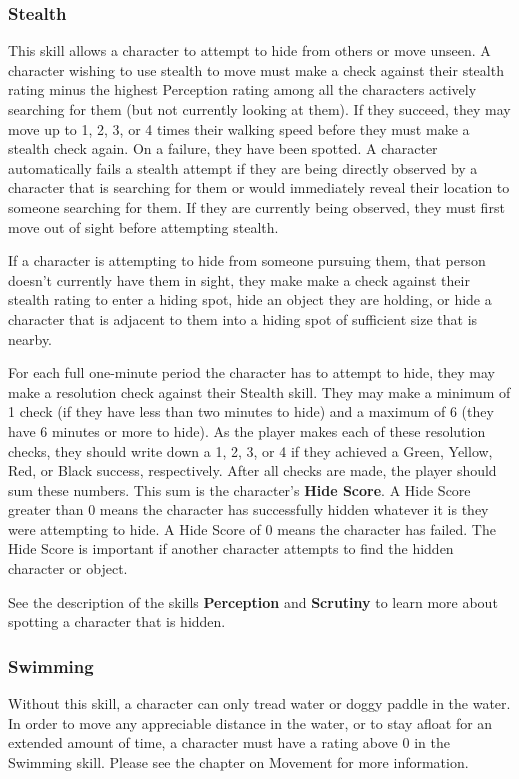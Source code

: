 \documentclass[oneside]{book}
\begin{document}
\begin{multicols}{2}
\subsubsection{Stealth}
This skill allows a character to attempt to hide from others or move unseen. A character wishing to use stealth to move must make a check against their stealth rating minus the highest Perception rating among all the characters actively searching for them (but not currently looking at them). If they succeed, they may move up to 1, 2, 3, or 4 times their walking speed before they must make a stealth check again. On a failure, they have been spotted. A character automatically fails a stealth attempt if they are being directly observed by a character that is searching for them or would immediately reveal their location to someone searching for them. If they are currently being observed, they must first move out of sight before attempting stealth. 

If a character is attempting to hide from someone pursuing them, that person doesn't currently have them in sight, they make make a check against their stealth rating to enter a hiding spot, hide an object they are holding, or hide a character that is adjacent to them into a hiding spot of sufficient size that is nearby.

 For each full one-minute period the character has to attempt to hide, they may make a resolution check against their Stealth skill. They may make a minimum of 1 check (if they have less than two minutes to hide) and a maximum of 6 (they have 6 minutes or more to hide). As the player makes each of these resolution checks, they should write down a 1, 2, 3, or 4 if they achieved a Green, Yellow, Red, or Black success, respectively. After all checks are made, the player should sum these numbers. This sum is the character's \textbf{Hide Score}. A Hide Score greater than 0 means the character has successfully hidden whatever it is they were attempting to hide. A Hide Score of 0 means the character has failed. The Hide Score is important if another character attempts to find the hidden character or object.

See the description of the skills \textbf{Perception} and \textbf{Scrutiny} to learn more about spotting a character that is hidden. 

\subsubsection{Swimming}
Without this skill, a character can only tread water or doggy paddle in the water. In order to move any appreciable distance in the water, or to stay afloat for an extended amount of time, a character must have a rating above 0 in the Swimming skill. Please see the chapter on Movement for more information.


\end{multicols}
\end{document}

